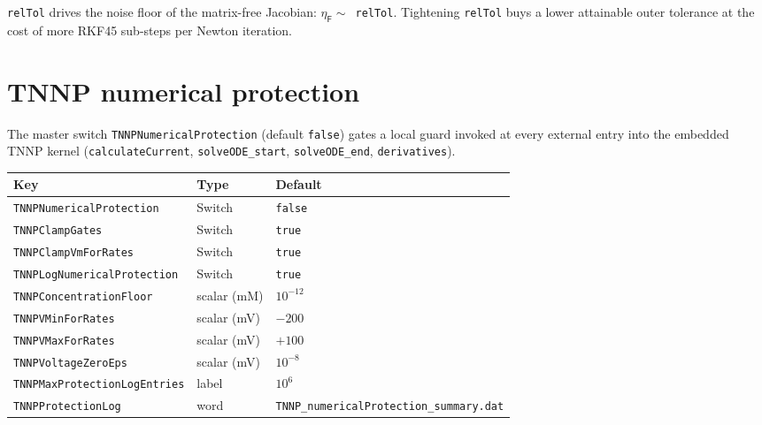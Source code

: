 \documentclass[11pt,a4paper]{article}
\newcommand{\code}[1]{\texttt{\small #1}}
\newcommand{\Fres}{\mathsf{F}}
\begin{document}
\code{relTol} drives the noise floor of the matrix-free Jacobian:
$\eta_{\Fres} \sim $~\code{relTol}. Tightening \code{relTol} buys
a lower attainable outer tolerance at the cost of more RKF45 sub-steps
per Newton iteration.

\section{TNNP numerical protection}

The master switch \code{TNNPNumericalProtection} (default \code{false})
gates a local guard invoked at every external entry into the embedded TNNP
kernel (\code{calculateCurrent}, \code{solveODE\_start},
\code{solveODE\_end}, \code{derivatives}).

\begin{center}
\begin{tabular}{@{}lll@{}}
\toprule
Key & Type & Default \\
\midrule
\code{TNNPNumericalProtection} & Switch & \code{false} \\
\code{TNNPClampGates} & Switch & \code{true} \\
\code{TNNPClampVmForRates} & Switch & \code{true} \\
\code{TNNPLogNumericalProtection} & Switch & \code{true} \\
\code{TNNPConcentrationFloor} & scalar (mM) & $10^{-12}$ \\
\code{TNNPVMinForRates} & scalar (mV) & $-200$ \\
\code{TNNPVMaxForRates} & scalar (mV) & $+100$ \\
\code{TNNPVoltageZeroEps} & scalar (mV) & $10^{-8}$ \\
\code{TNNPMaxProtectionLogEntries} & label & $10^{6}$ \\
\code{TNNPProtectionLog} & word & \code{TNNP\_numericalProtection\_summary.dat} \\
\bottomrule
\end{tabular}
\end{center}
\end{document}
